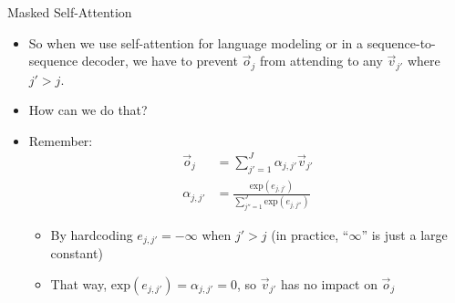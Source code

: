 \begin{vbframe}{Masked Self-Attention}

\vfill

\begin{itemize}
\item So when we use self-attention for language modeling or in a sequence-to-sequence decoder, we have to prevent $\vec o_j$ from attending to any $\vec v_{j'}$ where $j' > j$.
\item \ques How can we do that?
\item Remember:
$$ \begin{aligned}
\vec o_j & = \sum_{j' = 1}^{J} \alpha_{j,j'} \vec v_{j'} \\
 \alpha_{j,j'} & = \frac{\mathrm{exp}(e_{j,j'})}{\sum_{j'' = 1}^J \mathrm{exp}(e_{j,j''})}
\end{aligned}
$$
\begin{itemize}
\item By hardcoding $e_{j,j'} = -\infty$ when $j' > j$ (in practice, ``$\infty$'' is just a large constant)
\item That way, $\mathrm{exp}(e_{j,j'}) = \alpha_{j,j'} = 0$, so $\vec v_{j'}$ has no impact on $\vec o_j$
\end{itemize}
\end{itemize}

\vfill

\end{vbframe}

